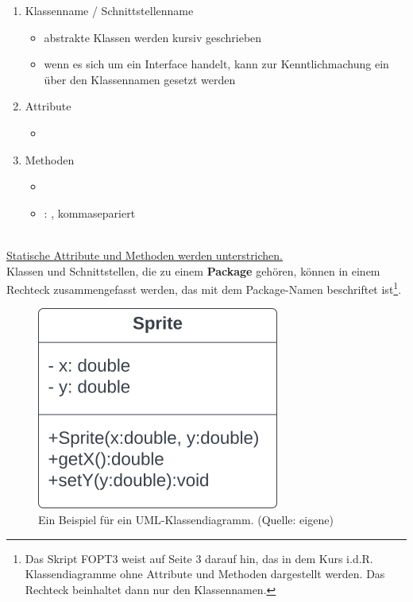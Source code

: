 \begin{enumerate}
    \item Klassenname / Schnittstellenname
        \begin{itemize}
            \item abstrakte Klassen werden kursiv geschrieben
            \item wenn es sich um ein Interface handelt, kann zur Kenntlichmachung ein  über den Klassennamen gesetzt werden
        \end{itemize}
    \item Attribute
        \begin{itemize}
            \item[] \code{[Sichtbarkeit] [Name]:[Typ]}
        \end{itemize}
    \item Methoden
    \begin{itemize}
        \item[] \code{[Sichtbarkeit] [Name]([Parameterliste]):[Rückgabetyp]}
        \item[] : , kommasepariert
    \end{itemize}
\end{enumerate}\\

\noindent
\ul{Statische Attribute und Methoden werden unterstrichen.}\\

\noindent
Klassen und Schnittstellen, die zu einem \textbf{Package} gehören, können in einem Rechteck zusammengefasst werden, das mit dem Package-Namen beschriftet ist\footnote{
Das Skript FOPT3 weist auf Seite 3 darauf hin, das in dem Kurs i.d.R. Klassendiagramme ohne Attribute und Methoden dargestellt werden. Das Rechteck beinhaltet dann nur den Klassennamen.
}.

\begin{figure}
    \centering
    \includegraphics[scale=0.5]{chapters/fopt3/img/classdiagram}
    \caption{Ein Beispiel für ein UML-Klassendiagramm. (Quelle: eigene)}
    \label{fig:classdiagram}
\end{figure}

